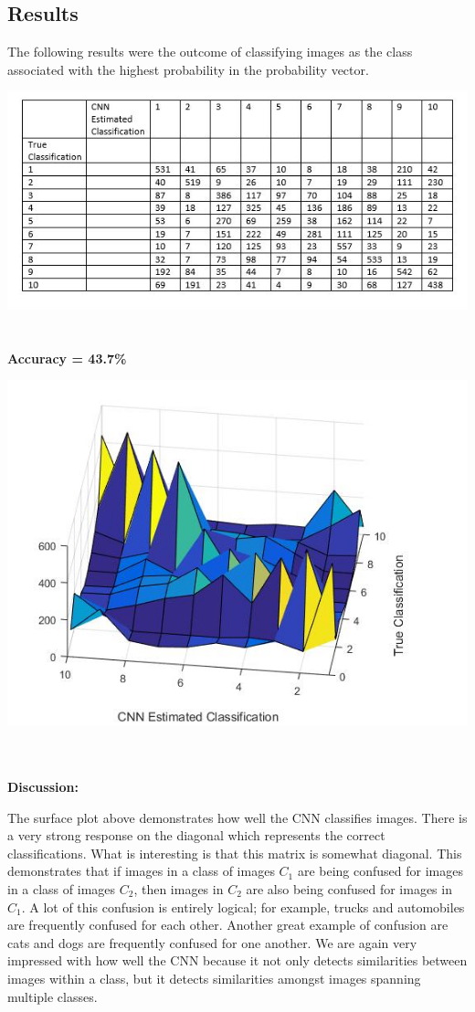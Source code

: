 \documentclass[11pt,english]{article}
\begin{document}
\subsection{Results}
	The following results were the outcome of classifying images as the class associated with the highest probability in the probability vector.
\begin{center}
	\includegraphics[scale=0.8]{confusionmatrix}
	~\\~\\
	
		\textbf{Accuracy = 43.7\%}
\end{center}


\begin{center}
	\includegraphics[scale=0.7]{confsurf}
	~\\~\\
\end{center}
\textbf{Discussion:}

	
   The surface plot above demonstrates how well the CNN classifies images. There is a very strong response on the diagonal which represents the correct classifications. What is interesting is that this matrix is somewhat diagonal. This demonstrates that if images in a class of images $C_1$ are being confused for images in a class of images $C_2$, then images in $C_2$ are also being confused for images in $C_1$. A lot of this confusion is entirely logical; for example, trucks and automobiles are frequently confused for each other. Another great example of confusion are cats and dogs are frequently confused for one another. We are again very impressed with how well the CNN because it not only detects similarities between images within a class, but it detects similarities amongst images spanning multiple classes.
       
\end{document}
